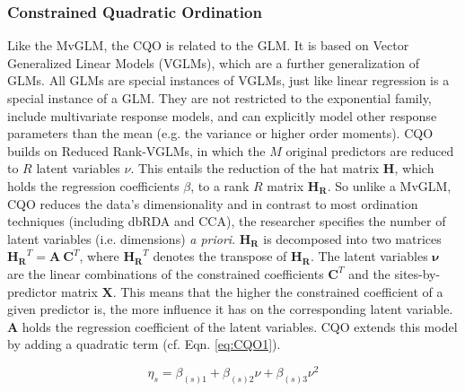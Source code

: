 \documentclass[a4paper,11pt]{article}
\begin{document}
        \subsubsection*{Constrained Quadratic Ordination}
	    Like the MvGLM, the CQO is related to the GLM. 
		It is based on Vector Generalized Linear Models (VGLMs), which are a further generalization of GLMs.
		All GLMs are special instances of VGLMs, just like linear regression is a special instance of a GLM.
		They are not restricted to the exponential family, include multivariate response models, and can explicitly model other response parameters than the mean (e.g. the variance or higher order moments).
        CQO builds on Reduced Rank-VGLMs, in which the $M$ original predictors are reduced to $R$ latent variables $\nu$. 
		This entails the reduction of the hat matrix $\mathbf{H}$, which holds the regression coefficients $\beta$, to a rank $R$ matrix $\mathbf{H_R}$.
		So unlike a MvGLM, CQO reduces the data's dimensionality and in contrast to most ordination techniques (including dbRDA and CCA), the researcher specifies the number of latent variables (i.e. dimensions)  \textit{a priori}.
		$\mathbf{H_R}$ is decomposed into two matrices $\mathbf{H_R}^T = \mathbf{A}\ \mathbf{C}^T$, where $\mathbf{H_R}^T$ denotes the transpose of $\mathbf{H_R}$.  
		The latent variables $\mathbf{\nu}$ are the linear combinations of the constrained coefficients $\mathbf{C}^T$ and the sites-by-predictor matrix $\mathbf{X}$.
		This means that the higher the constrained coefficient of a given predictor is, the more influence it has on the corresponding latent variable.   
		$\mathbf{A}$ holds the regression coefficient of the latent variables.
		CQO extends this model by adding a quadratic term (cf. Eqn. \ref{eq:CQO1}). 
	
		\begin{equation}\label{eq:CQO1} 
		\eta_s = \beta_{(s)1} + \beta_{(s)2} \nu + \beta_{(s)3} \nu^2	
		\end{equation} 
		
\end{document}

